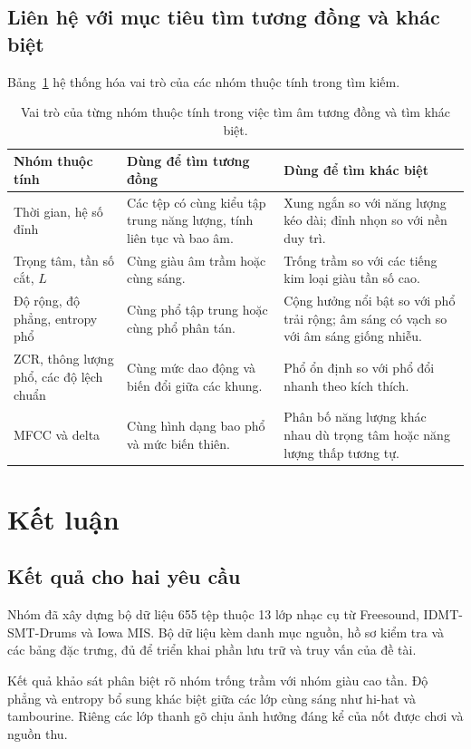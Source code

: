 \documentclass[11pt,a4paper]{article}
\begin{document}
\subsection{Liên hệ với mục tiêu tìm tương đồng và khác biệt}
Bảng~\ref{tab:vaitro} hệ thống hóa vai trò của các nhóm thuộc tính trong tìm kiếm.
\begin{table}[htbp]
\centering\small
\caption{Vai trò của từng nhóm thuộc tính trong việc tìm âm tương đồng và tìm khác biệt.}\label{tab:vaitro}
\begin{tabularx}{\textwidth}{p{}XX}
\toprule
Nhóm thuộc tính & Dùng để tìm tương đồng & Dùng để tìm khác biệt\\\midrule
Thời gian, hệ số đỉnh & Các tệp có cùng kiểu tập trung năng lượng, tính liên tục và bao âm. & Xung ngắn so với năng lượng kéo dài; đỉnh nhọn so với nền duy trì.\\
Trọng tâm, tần số cắt, $L$ & Cùng giàu âm trầm hoặc cùng sáng. & Trống trầm so với các tiếng kim loại giàu tần số cao.\\
Độ rộng, độ phẳng, entropy phổ & Cùng phổ tập trung hoặc cùng phổ phân tán. & Cộng hưởng nổi bật so với phổ trải rộng; âm sáng có vạch so với âm sáng giống nhiễu.\\
ZCR, thông lượng phổ, các độ lệch chuẩn & Cùng mức dao động và biến đổi giữa các khung. & Phổ ổn định so với phổ đổi nhanh theo kích thích.\\
MFCC và delta & Cùng hình dạng bao phổ và mức biến thiên. & Phân bố năng lượng khác nhau dù trọng tâm hoặc năng lượng thấp tương tự.\\\bottomrule
\end{tabularx}
\end{table}
\clearpage

\section{Kết luận}\label{sec:ketluan}
\subsection{Kết quả cho hai yêu cầu}
Nhóm đã xây dựng bộ dữ liệu 655 tệp thuộc 13 lớp nhạc cụ từ Freesound, IDMT-SMT-Drums và Iowa MIS. Bộ dữ liệu kèm danh mục nguồn, hồ sơ kiểm tra và các bảng đặc trưng, đủ để triển khai phần lưu trữ và truy vấn của đề tài.

Kết quả khảo sát phân biệt rõ nhóm trống trầm với nhóm giàu cao tần. Độ phẳng và entropy bổ sung khác biệt giữa các lớp cùng sáng như hi-hat và tambourine. Riêng các lớp thanh gõ chịu ảnh hưởng đáng kể của nốt được chơi và nguồn thu.
\end{document}
